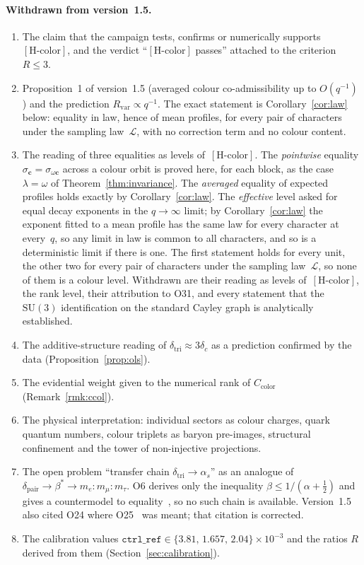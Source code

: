 \documentclass[12pt,a4paper]{article}
\theoremstyle{definition}
\theoremstyle{remark}
\newcommand{\Hcolor}{[\mathrm{H\text{-}color}]}
\newcommand{\Rvar}{R_{\mathrm{var}}}
\newcommand{\dtri}{\delta_{\mathrm{tri}}}
\newcommand{\Ccol}{C_{\mathrm{color}}}
\begin{document}
  \paragraph{Withdrawn from version~1.5.}
  \begin{enumerate}
    \item The claim that the campaign tests, confirms or numerically supports~$\Hcolor$, and the
    verdict ``$\Hcolor$ passes'' attached to the criterion $R\leq3$.
    \item Proposition~1 of version~1.5 (averaged colour co-admissibility up to $O(q^{-1})$) and
    the prediction $\Rvar\propto q^{-1}$.
    The exact statement is Corollary~\ref{cor:law} below: equality in law, hence of mean profiles,
    for every pair of characters under the sampling law~$\mathcal L$, with no correction term and no
    colour content.
    \item The reading of three equalities as levels of~$\Hcolor$.
    The \emph{pointwise} equality $\sigma_{\mathbf c}=\sigma_{\omega\mathbf c}$ across a colour orbit is
    proved here, for each block, as the case $\lambda=\omega$ of Theorem~\ref{thm:invariance}.
    The \emph{averaged} equality of expected profiles holds exactly by Corollary~\ref{cor:law}.
    The \emph{effective} level asked for equal decay exponents in the $q\to\infty$ limit; by
    Corollary~\ref{cor:law} the exponent fitted to a mean profile has the same law for every
    character at every~$q$, so any limit in law is common to all characters, and so is a deterministic
    limit if there is one.
    The first statement holds for every unit, the other two for every pair of characters under the
    sampling law~$\mathcal L$, so none of them is a colour level.
    Withdrawn are their reading as levels of~$\Hcolor$, the rank level, their attribution to O31,
    and every statement that the $\mathrm{SU}(3)$ identification on the standard Cayley graph is
    analytically established.
    \item The additive-structure reading of $\dtri\approx3\delta_c$ as a prediction confirmed by
    the data (Proposition~\ref{prop:ols}).
    \item The evidential weight given to the numerical rank of $\Ccol$ (Remark~\ref{rmk:ccol}).
    \item The physical interpretation: individual sectors as colour charges, quark quantum
    numbers, colour triplets as baryon pre-images, structural confinement and the tower of
    non-injective projections.
    \item The open problem ``transfer chain $\dtri\to\alpha_s$'' as an analogue of
    $\delta_{\mathrm{pair}}\to\beta^{*}\to m_e:m_\mu:m_\tau$.
    O6 derives only the inequality $\beta\leq1/(\alpha+\tfrac12)$ and gives a countermodel to
    equality~\cite{Beau2026a10}, so no such chain is available.
    Version~1.5 also cited O24 where O25~\cite{Beau2026a29} was meant; that citation is
    corrected.
    \item The calibration values $\mathtt{ctrl\_ref}\in\{3.81,\,1.657,\,2.04\}\times10^{-3}$ and the
    ratios $R$ derived from them (Section~\ref{sec:calibration}).
  \end{enumerate}
\end{document}
